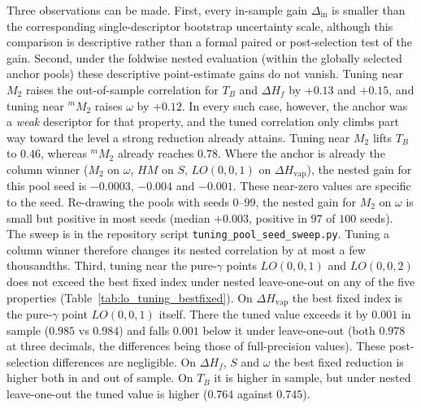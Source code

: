 \documentclass[a5paper, 10pt]{article}
\theoremstyle{plain}
\theoremstyle{remark}
\theoremstyle{definition}
\begin{document}
Three observations can be made. First, every in-sample gain
$\Delta_{\mathrm{in}}$ is smaller than the corresponding
single-descriptor bootstrap uncertainty scale, although this comparison
is descriptive rather than a formal paired or post-selection test of
the gain. Second, under the foldwise nested evaluation (within the
globally selected anchor pools) these descriptive point-estimate gains
do not vanish. Tuning near $M_2$ raises the out-of-sample correlation
for $T_B$ and $\Delta H_f$ by $+0.13$ and $+0.15$, and tuning near
${}^{m}\!M_2$ raises $\omega$ by $+0.12$. In every such case, however,
the anchor was a \emph{weak} descriptor for that property, and the
tuned correlation only climbs part way toward the level a strong
reduction already attains. Tuning near $M_2$ lifts $T_B$ to $0.46$, whereas
${}^{m}\!M_2$ already reaches $0.78$. Where the anchor is already the
column winner ($M_2$ on $\omega$, $HM$ on $S$, $LO(0, 0, 1)$ on
$\Delta H_{\mathrm{vap}}$), the nested gain for this pool seed is
$-0.0003$, $-0.004$ and $-0.001$. These near-zero values are specific
to the seed. Re-drawing the pools with seeds $0$--$99$, the nested gain
for $M_2$ on $\omega$ is small but positive in most seeds (median
$+0.003$, positive in $97$ of $100$ seeds). The sweep is in the
repository script \texttt{tuning\_pool\_seed\_sweep.py}. Tuning a
column winner therefore changes its nested correlation by at most a few
thousandths. Third, tuning near the pure-$\gamma$ points $LO(0, 0, 1)$
and $LO(0, 0, 2)$ does not exceed the best fixed index under nested
leave-one-out on any of the five properties
(Table~\ref{tab:lo_tuning_bestfixed}). On $\Delta H_{\mathrm{vap}}$
the best fixed index is the pure-$\gamma$ point $LO(0, 0, 1)$ itself.
There the tuned value exceeds it by $0.001$ in sample ($0.985$ vs
$0.984$) and falls $0.001$ below it under leave-one-out (both $0.978$
at three decimals, the differences being those of full-precision
values). These post-selection differences are negligible. On $\Delta H_f$, $S$ and $\omega$ the best fixed reduction is higher both in and out of sample. On $T_B$ it is higher in sample, but under nested leave-one-out the tuned value is higher ($0.764$ against $0.745$).
\end{document}
